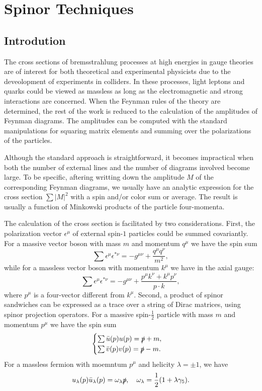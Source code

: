 \chapter{Spinor Techniques}
\section{Introdution}
The cross sections of bremsstrahlung processes at high energies in gauge theories are of interest for both theoretical and experimental physicists due to the deveolopment of experiments in colliders. In these processes, light leptons and quarks could be viewed as massless as long as the electromagnetic and strong interactions are concerned. When the Feynman rules of the theory are determined, the rest of the work is reduced to the calculation of the amplitudes of Feynman diagrams. The amplitudes can be computed with the standard manipulations for squaring matrix elements and summing over the polarizations of the particles. 

Although the standard approach is straightforward, it becomes impractical when both the number of external lines and the number of diagrams involved become large. To be specific, aftering writting down the amplitude $M$ of the corresponding Feynman diagrams, we usually have an analytic expression for the cross section $\sum |M|^2$ with a spin and/or color sum or average. The result is usually a function of Minkowski products of the particle four-momenta. 

The calculation of the cross section is facilitated by two considerations. First, the polarization vector $\epsilon^\mu$ of external spin-$1$ particles could be summed covariantly. For a massive vector boson with mass $m$ and momentum $q^\mu$ we have the spin sum
\begin{equation}
\sum\epsilon^\mu\epsilon^{\ast\nu}=-g^{\mu\nu}+\frac{q^\mu q^\nu}{m^2},
\end{equation}
while for a massless vector boson with momentum $k^\mu$ we have in the axial gauge:
\begin{equation}
\sum\epsilon^\mu\epsilon^{\ast\nu}=-g^{\mu\nu}+\frac{p^\mu k^\nu+k^\mu p^\nu}{p\cdot k},
\end{equation}
where $p^\mu$ is a four-vector different from $k^\mu$. Second, a product of spinor sandwiches can be expressed as a trace over a string of Dirac matrices, using spinor projection operators. For a massive spin-$\frac{1}{2}$ particle with mass $m$ and momentum $p^\mu$ we have the spin sum 
\begin{equation}
\begin{cases}
\sum\bar{u}(p)u(p)=\slashed p+m,\\
\sum\bar{v}(p)v(p)=\slashed p-m.
\end{cases}
\end{equation}
For a massless fermion with moemntum $p^\mu$ and helicity $\lambda=\pm1$, we have
\begin{equation}
u_\lambda(p)\bar{u}_\lambda(p)=\omega_\lambda\slashed{p},\quad \omega_\lambda=\frac{1}{2}(1+\lambda\gamma_5).
\end{equation}

